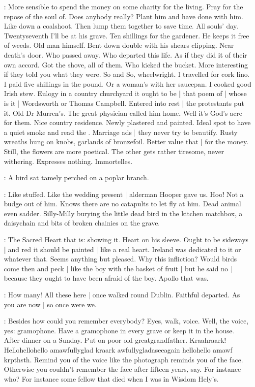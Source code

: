 \BloomInt:
More sensible
to spend the money on some charity for the living.
Pray for the repose of the soul of.
Does anybody really?
Plant him and have done with him.
Like down a coalshoot.
Then lump them together to save time.
All souls' day.
Twentyseventh I'll be at his grave.
Ten shillings for the gardener.
He keeps it free of weeds.
Old man himself.
Bent down double with his shears clipping.
Near death's door.
Who passed away.
Who departed this life.
As if they did it of their own accord.
Got the shove, all of them.
Who kicked the bucket.
More interesting if they told you what they were.
So and So, wheelwright.
I travelled for cork lino.
I paid five shillings in the pound.
Or a woman's with her saucepan.
I cooked good Irish stew.
Eulogy in a country churchyard it ought to be |
that poem of |
whose is it |
Wordsworth or Thomas Campbell.
Entered into rest |
the protestants put it.
Old Dr Murren's.
The great physician called him home.
Well it's God's acre for them.
Nice country residence.
Newly plastered and painted.
Ideal spot to have a quiet smoke and read the .
Marriage ads |
they never try to beautify.
Rusty wreaths hung on knobs, garlands of bronzefoil.
Better value that |
for the money.
Still, the flowers are more poetical.
The other gets rather tiresome, never withering.
Expresses nothing.
Immortelles.

:
A bird sat tamely perched on a poplar branch.

\BloomInt:
Like stuffed.
Like the wedding present |
alderman Hooper gave us.
Hoo!
Not a budge out of him.
Knows there are no catapults to let fly at him.
Dead animal even sadder.
Silly-Milly burying the little dead bird in the kitchen matchbox,
a daisychain and bits of broken chainies on the grave.

\BloomInt:
The Sacred Heart that is:
showing it.
Heart on his sleeve.
Ought to be sideways |
and red it should be painted |
like a real heart.
Ireland was dedicated to it or whatever that.
Seems anything but pleased.
Why this infliction?
Would birds come then and peck |
like the boy with the basket of fruit |
but he said no |
because they ought to have been afraid of the boy.
Apollo that was.

\BloomInt:
How many!
All these here |
once walked round Dublin.
Faithful departed.
As you are now |
so once were we.

\BloomInt:
Besides how could you remember everybody?
Eyes, walk, voice.
Well, the voice, yes:
gramophone.
Have a gramophone in every grave or keep it in the house.
After dinner on a Sunday.
Put on poor old greatgrandfather.
Kraahraark!
Hellohellohello amawfullyglad kraark awfullygladaseeagain hellohello amawf krpthsth.
Remind you of the voice
like the photograph reminds you of the face.
Otherwise you couldn't remember the face after fifteen years, say.
For instance who?
For instance some fellow that died
when I was in Wisdom Hely's.

